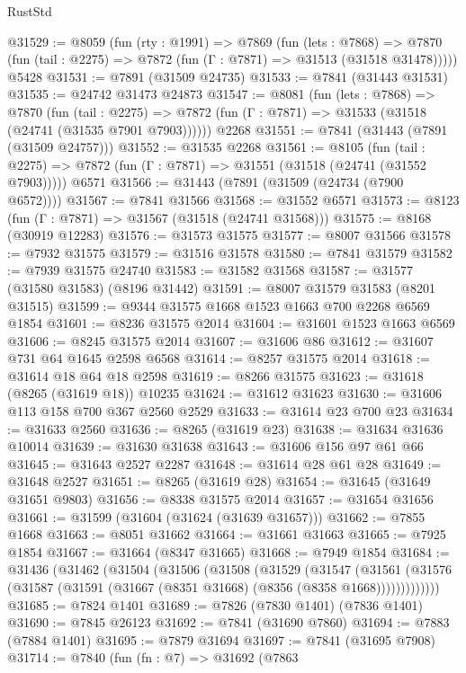 \begin{lexlean}{RustStd}
\begin{coremodule}
{\begin{coremodule}
{{{{{{{{{{{{{{{{{{{{{{{{{{{{{{{{{{{{{{{{{{{{{{{{{{{{{{@31529 := @8059
    (fun (rty : @1991) =>
    @7869
      (fun (lets : @7868) =>
      @7870 (fun (tail : @2275) => @7872 (fun (Γ : @7871) => @31513 (@31518 @31478)))))
    @5428
@31531 := @7891 (@31509 @24735)
@31533 := @7841 (@31443 @31531)
@31535 := @24742 @31473 @24873
@31547 := @8081
    (fun (lets : @7868) =>
    @7870
      (fun (tail : @2275) =>
      @7872 (fun (Γ : @7871) => @31533 (@31518 (@24741 (@31535 @7901 @7903))))))
    @2268
@31551 := @7841 (@31443 (@7891 (@31509 @24757)))
@31552 := @31535 @2268
@31561 := @8105
    (fun (tail : @2275) => @7872 (fun (Γ : @7871) => @31551 (@31518 (@24741 (@31552 @7903)))))
    @6571
@31566 := @31443 (@7891 (@31509 (@24734 (@7900 @6572))))
@31567 := @7841 @31566
@31568 := @31552 @6571
@31573 := @8123 (fun (Γ : @7871) => @31567 (@31518 (@24741 @31568)))
@31575 := @8168 (@30919 @12283)
@31576 := @31573 @31575
@31577 := @8007 @31566
@31578 := @7932 @31575
@31579 := @31516 @31578
@31580 := @7841 @31579
@31582 := @7939 @31575 @24740
@31583 := @31582 @31568
@31587 := @31577 (@31580 @31583) (@8196 @31442)
@31591 := @8007 @31579 @31583 (@8201 @31515)
@31599 := @9344 @31575 @1668 @1523 @1663 @700 @2268 @6569 @1854
@31601 := @8236 @31575 @2014
@31604 := @31601 @1523 @1663 @6569
@31606 := @8245 @31575 @2014
@31607 := @31606 @86
@31612 := @31607 @731 @64 @1645 @2598 @6568
@31614 := @8257 @31575 @2014
@31618 := @31614 @18 @64 @18 @2598
@31619 := @8266 @31575
@31623 := @31618 (@8265 (@31619 @18)) @10235
@31624 := @31612 @31623
@31630 := @31606 @113 @158 @700 @367 @2560 @2529
@31633 := @31614 @23 @700 @23
@31634 := @31633 @2560
@31636 := @8265 (@31619 @23)
@31638 := @31634 @31636 @10014
@31639 := @31630 @31638
@31643 := @31606 @156 @97 @61 @66
@31645 := @31643 @2527 @2287
@31648 := @31614 @28 @61 @28
@31649 := @31648 @2527
@31651 := @8265 (@31619 @28)
@31654 := @31645 (@31649 @31651 @9803)
@31656 := @8338 @31575 @2014
@31657 := @31654 @31656
@31661 := @31599 (@31604 (@31624 (@31639 @31657)))
@31662 := @7855 @1668
@31663 := @8051 @31662
@31664 := @31661 @31663
@31665 := @7925 @1854
@31667 := @31664 (@8347 @31665)
@31668 := @7949 @1854
@31684 := @31436
    (@31462
      (@31504
        (@31506
          (@31508
            (@31529
              (@31547
                (@31561
                  (@31576 (@31587 (@31591 (@31667 (@8351 @31668) (@8356 (@8358 @1668)))))))))))))
@31685 := @7824 @1401
@31689 := @7826 (@7830 @1401) (@7836 @1401)
@31690 := @7845 @26123
@31692 := @7841 (@31690 @7860)
@31694 := @7883 (@7884 @1401)
@31695 := @7879 @31694
@31697 := @7841 (@31695 @7908)
@31714 := @7840
    (fun (fn : @7) =>
    @31692
      (@7863
}}}}}}}}}}}}}}}}}}}}}}}}}}}}}}}}}}}}}}}}}}}}}}}}}}}}}}
\end{coremodule}}
\end{coremodule}
\end{lexlean}
